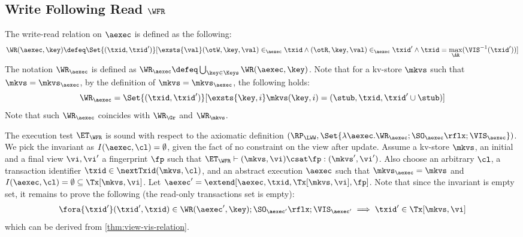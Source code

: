 \subsection{Write Following Read \( \WFR \) }
\label{sec:sound-complete-wfr}

The write-read relation  on \( \aexec \) is defined as the following:
\[
    \WR(\aexec, \key) \defeq \Set{ (\txid, \txid') }[ \exsts{\val} (\otW, \key, \val) \in_\aexec \txid \land (\otR, \key, \val) \in_\aexec \txid' \land \txid = \max_\AR(\VIS^{-1}(\txid')) ]
\]
The notation \( \WR_\aexec \) is defined as \( \WR_\aexec \defeq \bigcup_{\key \in \Keys} \WR(\aexec, \key) \).
Note that for a kv-store \( \mkvs \) such that \( \mkvs = \mkvs_\aexec \),
by the definition of  \(  \mkvs = \mkvs_\aexec \), 
the following holds:
\[
    \WR_\aexec = \Set{(\txid, \txid')}[\exsts{\key, i } \mkvs(\key, i) = (\stub, \txid, \txid'\cup \stub)]
\]
Note that such \( \WR_\aexec \) coincides with \( \WR_\Gr \) and \( \WR_\mkvs \).

The execution test $\ET_\WFR$ is sound with respect to the axiomatic definition 
\( (\RP_{\LWW}, \Set{\lambda \aexec. \WR_\aexec ; \SO_{\aexec}\rflx ; \VIS_{\aexec} })\).
We pick the invariant as \( I( \aexec, \cl ) = \emptyset \), given the fact of no constraint on the view after update.
Assume a kv-store $\mkvs$, an initial and a final view $\vi, \vi'$  a fingerprint $\fp$ 
such that $\ET_{\WFR} \vdash (\mkvs, \vi) \csat \fp: (\mkvs', \vi')$. 
Also choose an arbitrary $\cl$, a transaction identifier $\txid \in \nextTxid(\mkvs, \cl)$, 
and an abstract execution $\aexec$ such that $\mkvs_{\aexec} = \mkvs$ and 
\( I(\aexec, \cl) =  \emptyset \subseteq \Tx[\mkvs, \vi] \).
Let \( \aexec' = \extend[\aexec, \txid, \Tx[\mkvs, \vi], \fp] \).
Note that since the invariant is empty set, it remains to prove the following (the read-only transactions set is empty):
\[
    \begin{array}{@{}l@{}}
        \fora{ \txid' } 
        (\txid' ,\txid)  \in \WR(\aexec',\key) ; \SO_{\aexec'}\rflx ; \VIS_{\aexec'} 
        \implies \txid' \in \Tx[\mkvs, \vi]
    \end{array}
\]
which can be derived from \cref{thm:view-vis-relation}.

